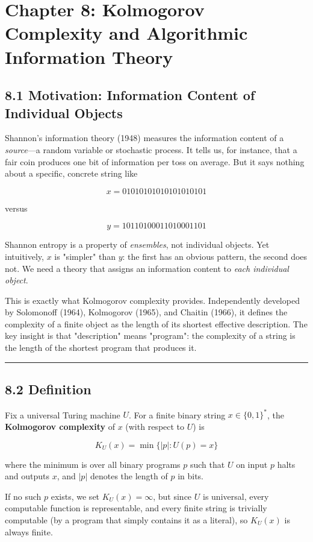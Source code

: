 \chapter{Chapter 8: Kolmogorov Complexity and Algorithmic Information Theory}

\section{8.1 Motivation: Information Content of Individual Objects}

Shannon's information theory (1948) measures the information content of a \textit{source}—a random variable or stochastic process. It tells us, for instance, that a fair coin produces one bit of information per toss on average. But it says nothing about a specific, concrete string like

\[
x = 01010101010101010101
\]

versus

\[
y = 10110100011010001101
\]

Shannon entropy is a property of \textit{ensembles}, not individual objects. Yet intuitively, $x$ is "simpler" than $y$: the first has an obvious pattern, the second does not. We need a theory that assigns an information content to \textit{each individual object}.

This is exactly what Kolmogorov complexity provides. Independently developed by Solomonoff (1964), Kolmogorov (1965), and Chaitin (1966), it defines the complexity of a finite object as the length of its shortest effective description. The key insight is that "description" means "program": the complexity of a string is the length of the shortest program that produces it.

\bigskip\hrule\bigskip

\section{8.2 Definition}

Fix a universal Turing machine $U$. For a finite binary string $x \in \{ 0,1\} ^*$, the \textbf{Kolmogorov complexity} of $x$ (with respect to $U$) is

\[
K_U(x) = \min\{ |p| : U(p) = x\} 
\]

where the minimum is over all binary programs $p$ such that $U$ on input $p$ halts and outputs $x$, and $|p|$ denotes the length of $p$ in bits.

If no such $p$ exists, we set $K_U(x) = \infty$, but since $U$ is universal, every computable function is representable, and every finite string is trivially computable (by a program that simply contains it as a literal), so $K_U(x)$ is always finite.

